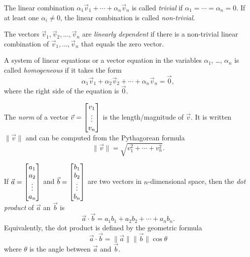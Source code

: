 \begin{SaveDefinition}[
	key=TrivialLinearCombination,
	title={Trivial Linear Combination}]

	The linear combination $\alpha_1\vec v_1+\cdots+\alpha_n\vec v_n$ is called
	\emph{trivial}
	if $\alpha_1=\cdots=\alpha_n=0$. If at least one $\alpha_i\neq 0$,
	the linear combination is called \emph{non-trivial}.
\end{SaveDefinition}

\begin{SaveDefinition}[
	key=LinearlyDependentIndependentAlgebraic,
	title={Linearly Dependent \& Independent (Algebraic)}]

	The vectors $\vec v_{1},\vec v_{2},\ldots,\vec v_{n}$ are
	\emph{linearly dependent} if there is a non-trivial linear combination
	of $\vec v_{1},\ldots,\vec v_{n}$ that equals the zero vector.
\end{SaveDefinition}

\begin{SaveDefinition}[
	key=HomogeneousSystem,
	title={Homogeneous System}]

	A system of linear equations or a vector equation in the variables $\alpha_1$, \ldots, 
	$\alpha_n$ is called
	\emph{homogeneous} if it takes the form
	\[
		\alpha_1\vec v_1+\alpha_2\vec v_2+\cdots +\alpha_n\vec v_n=\vec 0,
	\]
	where the right side of the equation is $\vec 0$.
\end{SaveDefinition}


\begin{SaveDefinition}[key=Norm, title={Norm}]
	The
	\emph{norm} of a vector $\vec v=\begin{bmatrix}v_1\\\vdots\\v_n\end{bmatrix}$ is the length/magnitude
	of $\vec v$. It is written $\|\vec v\|$ and can be computed from the Pythagorean
	formula
	\[
		\|\vec v\|=\sqrt{v_1^2+\cdots +v_n^2}.
	\]

\end{SaveDefinition}

\begin{SaveDefinition}[key=DotProduct, title={Dot Product}]
	If $\vec a=\begin{bmatrix}a_1\\a_2\\ \vdots\\a_n\end{bmatrix}$ and
	$\vec b=\begin{bmatrix}b_1\\b_2\\ \vdots\\b_n\end{bmatrix}$ are two vectors in $n$-dimensional
	space, then the
	\emph{dot product} of $\vec a$ an $\vec b$ is
	\[
		\vec a\cdot\vec b = a_{1}b_{1}+a_{2}b_{2}+\cdots+a_{n}b_{n}.
	\]
	 Equivalently, the dot product is defined by the geometric formula
	\[
		\vec a\cdot \vec b = \|\vec a\|\|\vec b\|\cos \theta
	\]
	 where $\theta$ is the angle between $\vec a$ and $\vec b$.
\end{SaveDefinition}

